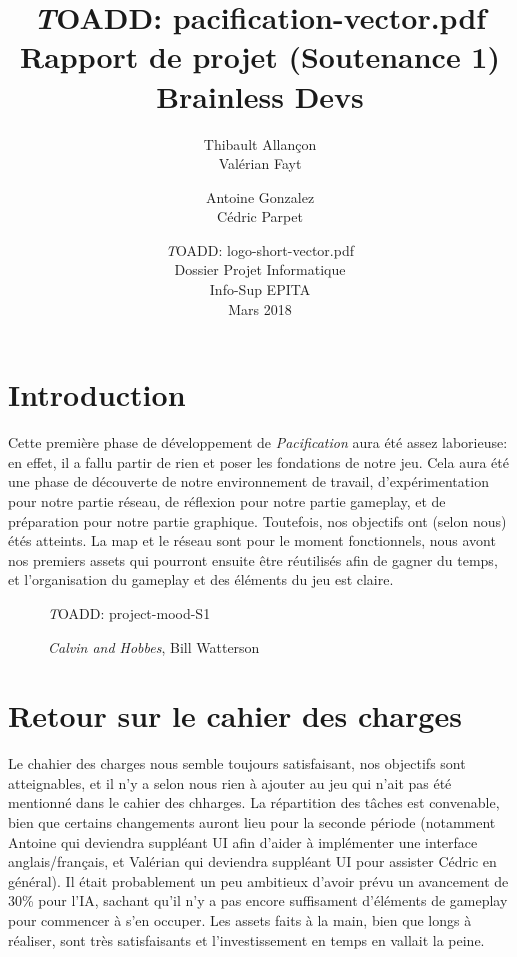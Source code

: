 \documentclass[12pt]{report}
\begin{document}
\title{
	{\vspace{3em}\textit TOADD: pacification-vector.pdf} \\
	{\vspace{4em}\Huge Rapport de projet (Soutenance 1)}\\
	{\large Brainless Devs}
}
\author{
	Thibault Allançon\\
	Valérian Fayt
	\and
	Antoine Gonzalez\\
	Cédric Parpet}
\date{
	{\vfill \textit TOADD: logo-short-vector.pdf}\\
	Dossier Projet Informatique\\
	Info-Sup EPITA\\
	Mars 2018
}
\maketitle
\tableofcontents

\chapter{Introduction}

Cette première phase de développement de \textit{Pacification} aura été assez laborieuse: en effet, il a fallu partir de rien et poser les fondations de notre jeu. Cela aura été une phase de découverte de notre environnement de travail, d'expérimentation pour notre partie réseau, de réflexion pour notre partie gameplay, et de préparation pour notre partie graphique. Toutefois, nos objectifs ont (selon nous) étés atteints. La map et le réseau sont pour le moment fonctionnels, nous avont nos premiers assets qui pourront ensuite être réutilisés afin de gagner du temps, et l'organisation du gameplay et des éléments du jeu est claire.

\begin{figure}
    \centering
    \textit TOADD: project-mood-S1
    \caption*{\textit{Calvin and Hobbes}, Bill Watterson}
\end{figure}

\chapter{Retour sur le cahier des charges}

Le chahier des charges nous semble toujours satisfaisant, nos objectifs sont atteignables, et il n'y a selon nous rien à ajouter au jeu qui n'ait pas été mentionné dans le cahier des chharges. La répartition des tâches est convenable, bien que certains changements auront lieu pour la seconde période (notamment Antoine qui deviendra suppléant UI afin d'aider à implémenter une interface anglais/français, et Valérian qui deviendra suppléant UI pour assister Cédric en général). Il était probablement un peu ambitieux d'avoir prévu un avancement de 30\% pour l'IA, sachant qu'il n'y a pas encore suffisament d'éléments de gameplay pour commencer à s'en occuper. Les assets faits à la main, bien que longs à réaliser, sont très satisfaisants et l'investissement en temps en vallait la peine.
\end{document}
